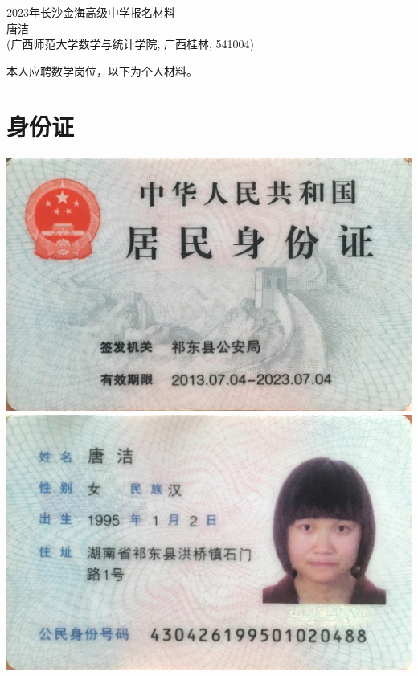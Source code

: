 \documentclass[UFT8]{ctexart}%
\begin{document}
\thispagestyle{empty} %
\vspace*{3cm}
\begin{center}
{{\LARGE\heiti 2023年长沙金海高级中学报名材料}\\[0.6cm]
{\normalsize 唐洁}\\[0.1cm]
{\small(广西师范大学数学与统计学院, 广西桂林, 541004)}}
\end{center}

\clearpage%
\tableofcontents%
\thispagestyle{empty} %

\clearpage%
\setcounter{page}{1}%
本人应聘数学岗位，以下为个人材料。

%

\section{身份证}
\begin{center}
  \includegraphics[scale=0.1]{figs/身份证1.JPG }
  \includegraphics[scale=0.1]{figs/身份证2.JPG }
\end{center}
\end{document}

